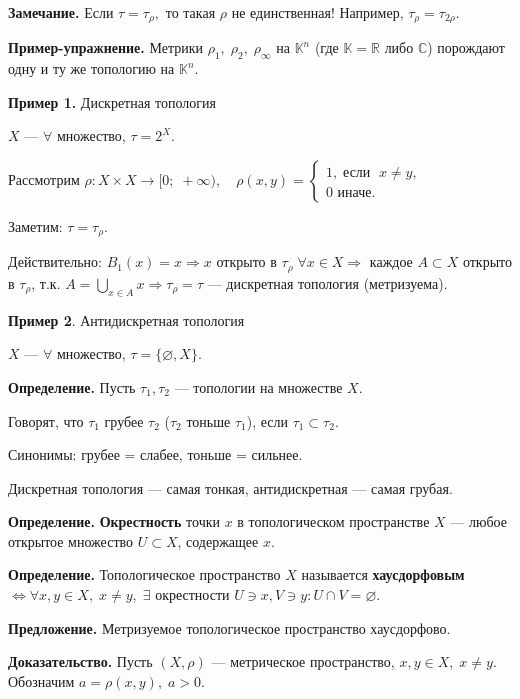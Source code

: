 \documentclass[12pt,a4paper]{article}
\begin{document}
\textbf{Замечание.} Если $\tau = \tau_{\rho},$ то такая $\rho$ не единственная! Например, $\tau_{\rho} = \tau_{2\rho}.$
	
\textbf{Пример-упражнение.} Метрики $\rho_1, \; \rho_2, \; \rho_{\infty}$ на $\mathbb{K}^n$ (где $\mathbb{K} = \mathbb{R}$ либо $\mathbb{C}$) порождают одну и ту же топологию на $\mathbb{K}^n.$
	
\textbf{Пример 1.} Дискретная топология
	
$X$ --- $\forall$ множество, $\tau = 2^X.$
	
Рассмотрим $\rho\!\!: X \times X \to [0; \; +\infty), \quad \rho(x,y) = \begin{cases} 1, \; \text{если } \; x \neq y, \\ 0 \text{ иначе.} \end{cases}$
	
Заметим: $\tau = \tau_{\rho}.$
	
Действительно: $B_1(x) = {x} \Rightarrow {x}$ открыто в $\tau_{\rho} \; \forall x \in X \Rightarrow$ каждое $A \subset X$ открыто в $\tau_{\rho}$, т.к. $A = \underset{x\in A}{\bigcup} {x} \Rightarrow \tau_{\rho} = \tau$ --- дискретная топология (метризуема).
	
\textbf{Пример 2}. Антидискретная топология
	
$X$ --- $\forall$ множество, $\tau = \{\varnothing, X\}.$
	
\textbf{Определение.} Пусть $\tau_1, \tau_2$ --- топологии на множестве $X.$
	
Говорят, что $\tau_1$ грубее $\tau_2$ ($\tau_2$ тоньше $\tau_1$), если $\tau_1 \subset \tau_2.$
	
Синонимы: грубее = слабее, тоньше = сильнее.
	
Дискретная топология --- самая тонкая, антидискретная --- самая грубая.
	
\textbf{Определение.} \textbf{Окрестность} точки $x$ в топологическом пространстве $X$ --- любое открытое множество $U \subset X$, содержащее $x.$
	
\textbf{Определение.} Топологическое пространство $X$ называется \textbf{хаусдорфовым} $\Leftrightarrow \forall x, y \in X, \; x \neq y, \; \exists$ окрестности $U \ni x, V \ni y\!\!: U \cap V = \varnothing.$
	
\textbf{Предложение.} Метризуемое топологическое пространство хаусдорфово.
	
\textbf{Доказательство.} Пусть $(X, \rho)$ --- метрическое пространство, $x, y \in X, \; x \neq y$. Обозначим $a = \rho(x, y), \; a > 0.$
	
\end{document}
